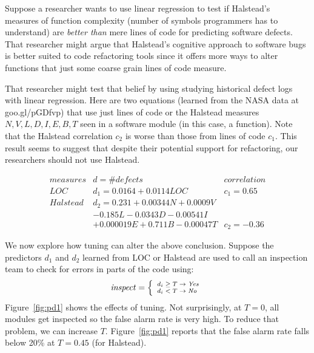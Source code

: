 \documentclass{sig-alternative}
\newcommand{\fig}[1]{Figure~\ref{fig:#1}}
\begin{document}
Suppose  a researcher wants to use linear regression
to test if Halstead's~\cite{halstead77} measures
of   function complexity
(number of symbols programmers has to understand) are   {\em better than}
mere lines of code for predicting
software defects.  That researcher might argue that Halstead's cognitive approach to
software bugs is better suited to code refactoring tools since it offers 
more ways to alter functions that just some coarse grain lines of code measure.


That researcher might test that belief by using studying historical
defect logs with 
linear regression. Here are two equations (learned from the NASA data at goo.gl/pGDfvp)
that use just lines of code or the Halstead measures $N,V,L,D,I,E,B,T$ seen in a
software module (in this case, a  function).
Note that the Halstead correlation $c_2$
is worse than those from lines of code $c_1$. This result  seems to suggest that
despite their potential support for refactoring, our researchers should not use Halstead.

{\scriptsize \[
\begin{array}{l|l|ll}
\mathit{measures} & d= \mathit{\#defects} & \mathit{correlation}\\\hline
\mathit{LOC}   &d_1= 0.0164 +0.0114\mathit{LOC}\ & c_1 = 0.65\\\hline
\mathit{Halstead} & d_2= 0.231 + 0.00344N  +  0.0009V    \\    
                 &   - 0.185L- 0.0343D      - 0.00541I  \\ 
                 & + 0.000019E + 0.711B  - 0.00047T  & c_2=-0.36  
\end{array}
\]
}
 

\noindent
We now explore how tuning can alter the above  conclusion. Suppose the  predictors $d_1$ and $d_2$  learned from LOC or Halstead
are used to call an inspection
team to check for errors in   parts of the code using:
\begin{equation}\label{eq:yesno}\scriptsize
\mathit{inspect}= \left\{
\begin{array}{ll}
d_i \ge T \rightarrow \mathit{Yes}\\
d_i <   T \rightarrow \mathit{No} 
\end{array}\right.
\end{equation}
\fig{pd1} shows the effects of tuning. Not surprisingly,
at $T=0$, all modules get inspected so the false alarm rate is very high. To reduce that
problem, we can increase $T$. \fig{pd1} reports that the false alarm rate falls below
20\% at $T=0.45$ (for Halstead). 
\end{document}
